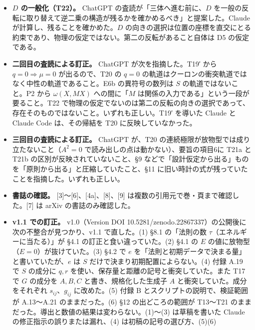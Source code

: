 \documentclass[
  a4paper,
]{ltjsarticle}
\begin{document}
\begin{itemize}
  の非自明な配置を持たない）、\(E\) と \(\tau\)
  の対応の書き方が不正確だったこと、距離の比と時計の刻みの比を同じものと書いていたことが見つかった。恒等式
  \(\mu=2q\operatorname{tr}(\Omega A)\)（T19′）も検算の過程で出たもので、初稿にはなかった。記号計算は付録
  B のスクリプトに残した。
\item
  \textbf{\(D\) の一般化（T22）。} ChatGPT
  の査読が「三体へ進む前に、\(D\)
  を一般の反転に取り替えて逆二乗の構造が残るかを確かめるべき」と提案した。Claude
  が計算し、残ることを確かめた。\(D\)
  の向きの選択は位置の座標を直交にとる約束であり、物理の仮定ではない。第二の反転があること自体は
  D5 の仮定である。
\item
  \textbf{二回目の査読による訂正。} ChatGPT が次を指摘した。T19′ から
  \(q=0\Rightarrow\mu=0\) が出るので、T20 の \(q=0\)
  の軌道はクーロンの衝突軌道ではなく中性の軌道であること。E6b
  の異符号の数列は \(S\) の軌道ではないこと。P2 から \(\omega(X,MX)\)
  への間に「\(M\) は関係の入力である」という一段が要ること。T22
  で物理の仮定でないのは第二の反転の向きの選択であって、存在そのものではないこと。いずれも正しい。T19′
  を導いた Claude と Claude Code は、その帰結を T20
  に反映していなかった。
\item
  \textbf{三回目の査読による訂正。} ChatGPT が、T20
  の連続極限が放物型では成り立たないこと（\(A^2=0\)
  で読み出しの点は動かない）、要旨の項目6に T21a と T21b
  の区別が反映されていないこと、§9
  などで「設計仮定から出る」ものを「原則から出る」と圧縮していたこと、§11
  に旧い時計の式が残っていたことを指摘した。いずれも正しい。
\item
  \textbf{書誌の確認。} {[}3{]}〜{[}6{]}、{[}4a{]}、{[}8{]}、{[}9{]}
  は複数の引用元で巻・頁まで確認した。{[}7{]} は arXiv
  の書誌のみ確認した。
\item
  \textbf{v1.1 での訂正。} v1.0（Version DOI
  10.5281/zenodo.22867337）の公開後に次の不整合が見つかり、v1.1
  で直した。(1) §8.1 の「法則の数 \(\tau\)（エネルギーに当たる）」が
  §4.1 の訂正と食い違っていた。(2) §4.1 の \(E\)
  の値に放物型（\(E=0\)）が抜けていた。(3) §4.2 で \(e\)
  を「法則と初期データで決まる量」と書いていたが、\(e\) は \(S\)
  だけで決まり初期配置によらない。(4) 付録 A.19 で \(S\) の成分に
  \(q,r\) を使い、保存量と距離の記号と衝突していた。また T17 で \(G\)
  の成分を \(A,B,C\) と書き、規格化した生成子 \(A\)
  と衝突していた。成分をそれぞれ \(s_{ij}\)、\(g_{ij}\) に改めた。(5)
  付録 B とスクリプトの説明で、検証範囲が A.13〜A.21 のままだった。(6)
  §12 の出どころの範囲が T13〜T21
  のままだった。導出と数値の結果は変わらない。(1)〜(3) は草稿を書いた
  Claude の修正指示の誤りまたは漏れ、(4) は初稿の記号の選び方、(5)(6)

\end{itemize}
\end{document}
